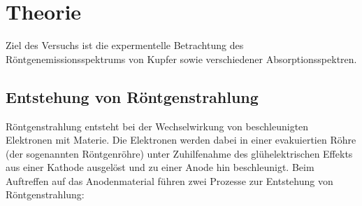\maketitle
\setcounter{page}{1}
\tableofcontents
\newpage
{}
\section{Theorie}
Ziel des Versuchs ist die expermentelle Betrachtung des Röntgenemissionsspektrums
von Kupfer sowie verschiedener Absorptionsspektren.
\subsection{Entstehung von Röntgenstrahlung}
Röntgenstrahlung entsteht bei der Wechselwirkung von beschleunigten Elektronen
mit Materie. Die Elektronen werden dabei in einer evakuiertien Röhre (der sogenannten
Röntgenröhre) unter Zuhilfenahme des glühelektrischen Effekts aus einer Kathode ausgelöst
und zu einer Anode hin beschleunigt. Beim Auftreffen auf das Anodenmaterial führen
zwei Prozesse zur Entstehung von Röntgenstrahlung:
